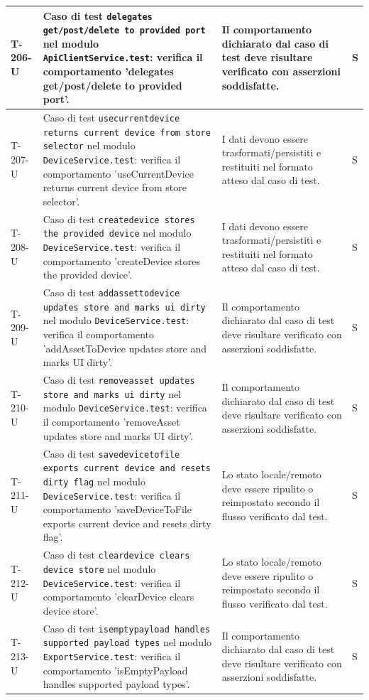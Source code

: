 \documentclass[a4paper,12pt]{article}
\begin{document}
{{\begin{longtable}{|>{\RaggedRight\arraybackslash}p{1.55cm}|>{\RaggedRight\arraybackslash}p{8.0cm}|>{\RaggedRight\arraybackslash}p{4.6cm}|>{\RaggedRight\arraybackslash}p{1.2cm}|}
        \hline
        T-206-U & Caso di test \texttt{delegates get/post/delete to provided port} nel modulo \texttt{ApiClientService.test}: verifica il comportamento 'delegates get/post/delete to provided port'. & Il comportamento dichiarato dal caso di test deve risultare verificato con asserzioni soddisfatte. & S \\
        \hline
        T-207-U & Caso di test \texttt{usecurrentdevice returns current device from store selector} nel modulo \texttt{DeviceService.test}: verifica il comportamento 'useCurrentDevice returns current device from store selector'. & I dati devono essere trasformati/persistiti e restituiti nel formato atteso dal caso di test. & S \\
        \hline
        T-208-U & Caso di test \texttt{createdevice stores the provided device} nel modulo \texttt{DeviceService.test}: verifica il comportamento 'createDevice stores the provided device'. & I dati devono essere trasformati/persistiti e restituiti nel formato atteso dal caso di test. & S \\
        \hline
        T-209-U & Caso di test \texttt{addassettodevice updates store and marks ui dirty} nel modulo \texttt{DeviceService.test}: verifica il comportamento 'addAssetToDevice updates store and marks UI dirty'. & Il comportamento dichiarato dal caso di test deve risultare verificato con asserzioni soddisfatte. & S \\
        \hline
        T-210-U & Caso di test \texttt{removeasset updates store and marks ui dirty} nel modulo \texttt{DeviceService.test}: verifica il comportamento 'removeAsset updates store and marks UI dirty'. & Il comportamento dichiarato dal caso di test deve risultare verificato con asserzioni soddisfatte. & S \\
        \hline
        T-211-U & Caso di test \texttt{savedevicetofile exports current device and resets dirty flag} nel modulo \texttt{DeviceService.test}: verifica il comportamento 'saveDeviceToFile exports current device and resets dirty flag'. & Lo stato locale/remoto deve essere ripulito o reimpostato secondo il flusso verificato dal test. & S \\
        \hline
        T-212-U & Caso di test \texttt{cleardevice clears device store} nel modulo \texttt{DeviceService.test}: verifica il comportamento 'clearDevice clears device store'. & Lo stato locale/remoto deve essere ripulito o reimpostato secondo il flusso verificato dal test. & S \\
        \hline
        T-213-U & Caso di test \texttt{isemptypayload handles supported payload types} nel modulo \texttt{ExportService.test}: verifica il comportamento 'isEmptyPayload handles supported payload types'. & Il comportamento dichiarato dal caso di test deve risultare verificato con asserzioni soddisfatte. & S \\

\end{longtable}}}
\end{document}
